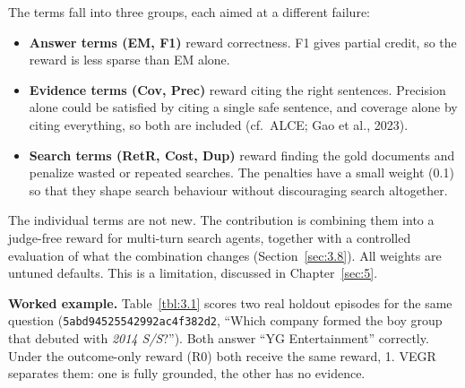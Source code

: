 The terms fall into three groups, each aimed at a different failure:

\begin{itemize}
\tightlist
\item
  \textbf{Answer terms (EM, F1)} reward correctness. F1 gives partial
  credit, so the reward is less sparse than EM alone.
\item
  \textbf{Evidence terms (Cov, Prec)} reward citing the right sentences.
  Precision alone could be satisfied by citing a single safe sentence,
  and coverage alone by citing everything, so both are included
  (cf.~ALCE; Gao et al., 2023).
\item
  \textbf{Search terms (RetR, Cost, Dup)} reward finding the gold
  documents and penalize wasted or repeated searches. The penalties have
  a small weight (0.1) so that they shape search behaviour without
  discouraging search altogether.
\end{itemize}

The individual terms are not new. The contribution is combining them
into a judge-free reward for multi-turn search agents, together with a
controlled evaluation of what the combination changes
(Section~\ref{sec:3.8}). All weights are untuned defaults. This is a
limitation, discussed in Chapter~\ref{sec:5}.

\textbf{Worked example.} Table~\ref{tbl:3.1} scores two real holdout
episodes for the same question (\texttt{5abd94525542992ac4f382d2},
``Which company formed the boy group that debuted with \emph{2014
S/S}?''). Both answer ``YG Entertainment'' correctly. Under the
outcome-only reward (R0) both receive the same reward, 1. VEGR separates
them: one is fully grounded, the other has no evidence.

